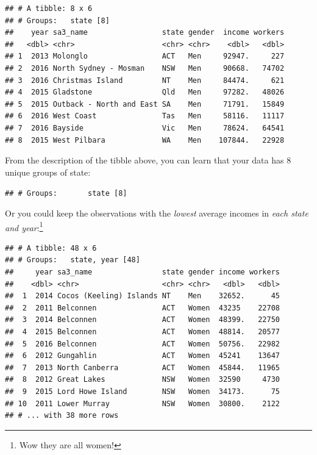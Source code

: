 \documentclass[]{book}
\newenvironment{Shaded}{\begin{snugshade}}{\end{snugshade}}
\newcommand{\KeywordTok}[1]{\textcolor[rgb]{0.13,0.29,0.53}{\textbf{#1}}}
\newcommand{\NormalTok}[1]{#1}
\newcommand{\OperatorTok}[1]{\textcolor[rgb]{0.81,0.36,0.00}{\textbf{#1}}}
\newcommand{\StringTok}[1]{\textcolor[rgb]{0.31,0.60,0.02}{#1}}
\begin{document}
\begin{verbatim}
## # A tibble: 8 x 6
## # Groups:   state [8]
##    year sa3_name                 state gender  income workers
##   <dbl> <chr>                    <chr> <chr>    <dbl>   <dbl>
## 1  2013 Molonglo                 ACT   Men     92947.     227
## 2  2016 North Sydney - Mosman    NSW   Men     90668.   74702
## 3  2016 Christmas Island         NT    Men     84474.     621
## 4  2015 Gladstone                Qld   Men     97282.   48026
## 5  2015 Outback - North and East SA    Men     71791.   15849
## 6  2016 West Coast               Tas   Men     58116.   11117
## 7  2016 Bayside                  Vic   Men     78624.   64541
## 8  2015 West Pilbara             WA    Men    107844.   22928
\end{verbatim}

From the description of the tibble above, you can learn that your data has 8 unique groups of state:

\texttt{\#\#\ \#\ Groups:\ \ \ \ \ \ \ state\ {[}8{]}}

Or you could keep the observations with the \emph{lowest} average incomes in \emph{each state and year}:\footnote{Wow they are all women!}

\begin{Shaded}
\end{Shaded}

\begin{verbatim}
## # A tibble: 48 x 6
## # Groups:   state, year [48]
##     year sa3_name                state gender income workers
##    <dbl> <chr>                   <chr> <chr>   <dbl>   <dbl>
##  1  2014 Cocos (Keeling) Islands NT    Men    32652.      45
##  2  2011 Belconnen               ACT   Women  43235    22708
##  3  2014 Belconnen               ACT   Women  48399.   22750
##  4  2015 Belconnen               ACT   Women  48814.   20577
##  5  2016 Belconnen               ACT   Women  50756.   22982
##  6  2012 Gungahlin               ACT   Women  45241    13647
##  7  2013 North Canberra          ACT   Women  45844.   11965
##  8  2012 Great Lakes             NSW   Women  32590     4730
##  9  2015 Lord Howe Island        NSW   Women  34173.      75
## 10  2011 Lower Murray            NSW   Women  30800.    2122
## # ... with 38 more rows
\end{verbatim}
\end{document}
